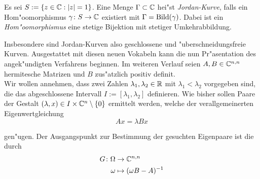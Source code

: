 \begin{defn} \label{def:jordankurve}
  Es sei $S:=\{z\in\mathbb{C} : |z| = 1\}$. Eine Menge
  $\Gamma\subset\mathbb{C}$ hei"st \emph{Jordan-Kurve}, falls
  ein Hom"oomorphismus $\gamma\colon S\to \mathbb{C}$ existiert mit $\Gamma = \operatorname{Bild}(\gamma)$. Dabei ist
  ein \emph{Hom"oomorphismus} eine stetige Bijektion mit stetiger Umkehrabbildung.
\end{defn}

Insbesondere sind Jordan-Kurven also geschlossene und "uberschneidungsfreie Kurven.
Ausgestattet mit diesen neuen Vokabeln kann die nun Pr"asentation des angek"undigten Verfahrens beginnen. Im weiteren Verlauf seien $A, B \in\mathbb{C}^{n,n}$ hermitesche Matrizen und $B$ zus"atzlich
positiv definit.\\

Wir wollen annehmen, dass zwei Zahlen $\lambda_1, \lambda_2 \in \mathbb{R}$ mit $\lambda_1 < \lambda_2$
vorgegeben sind, die das abgeschlossene Intervall $I:=[\lambda_1, \lambda_2]$ definieren.
Wie bisher sollen Paare der Gestalt $(\lambda, x) \in I \times \mathbb{C}^n \setminus\{0\}$ ermittelt werden,
welche der verallgemeinerten Eigenwertgleichung
  \begin{equation}\label{eq:eigen} %
  Ax = \lambda Bx
  \end{equation}

gen"ugen. Der Ausgangspunkt zur Bestimmung der gesuchten Eigenpaare %
ist die durch%
  \begin{align*}
  G\colon\Omega &\to\mathbb{C}^{n,n}\\
  \omega &\mapsto (\omega B - A)^{-1}
  \end{align*}

